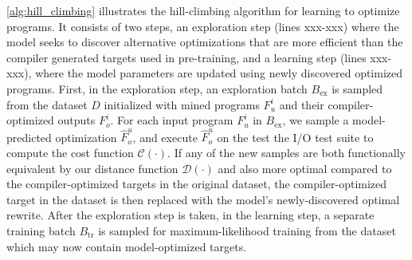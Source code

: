 \documentclass{article}
\begin{document}
\cref{alg:hill_climbing} illustrates the hill-climbing algorithm for learning to optimize programs.
It consists of two steps, an exploration step (lines xxx-xxx) where the model seeks to discover alternative optimizations that are more efficient than the compiler generated targets used in pre-training, and a learning step (lines xxx-xxx), where the model parameters are updated using newly discovered optimized programs.
First, in the exploration step, an exploration batch $B_{\mathrm{ex}}$ is sampled from the dataset $D$ initialized with mined programs $F^i_u$ and their compiler-optimized outputs $F^i_o$. 
For each input program $F^i_u$ in $B_{\mathrm{ex}}$, we sample a model-predicted optimization $\hat{F}^u_o$, and execute $\hat{F}^u_o$ on the test the I/O test suite to compute the cost function $\mathcal{C}(\cdot)$.
If any of the new samples are both functionally equivalent by our distance function $\mathcal{D}(\cdot)$ and also more optimal compared to the compiler-optimized targets in the original dataset, the compiler-optimized target in the dataset is then replaced with the model's newly-discovered optimal rewrite. 
After the exploration step is taken, in the learning step, a separate training batch $B_{\mathrm{tr}}$ is sampled for maximum-likelihood training from the dataset which may now contain model-optimized targets. 
\end{document}
